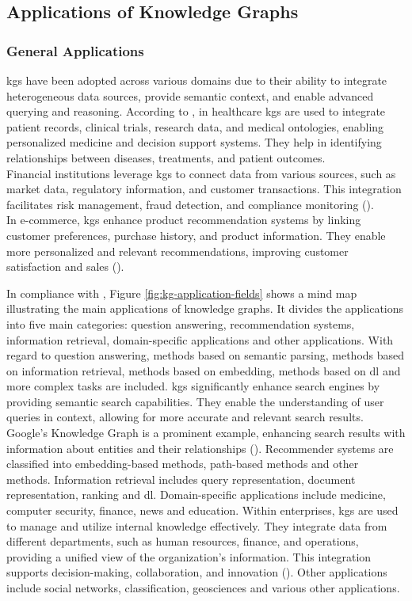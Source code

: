 \subsection*{Applications of Knowledge Graphs}

\subsubsection*{General Applications}
\glspl{kg} have been adopted across various domains due to their ability to integrate heterogeneous data sources, provide semantic context, and enable advanced querying and reasoning.
According to \cite{Kapanipathi2020}, in healthcare \glspl{kg} are used to integrate patient records, clinical trials, research data, and medical ontologies, enabling personalized medicine and decision support systems. They help in identifying relationships between diseases, treatments, and patient outcomes.
\\Financial institutions leverage \glspl{kg} to connect data from various sources, such as market data, regulatory information, and customer transactions. This integration facilitates risk management, fraud detection, and compliance monitoring (\cite{Tchechmedjiev2019}).
\\In e-commerce, \glspl{kg} enhance product recommendation systems by linking customer preferences, purchase history, and product information. They enable more personalized and relevant recommendations, improving customer satisfaction and sales (\cite{Zhang2021}).

In compliance with \cite{Zou2020}, Figure \ref{fig:kg-application-fields} shows a mind map illustrating the main applications of knowledge graphs. It divides the applications into five main categories: question answering, recommendation systems, information retrieval, domain-specific applications and other applications. With regard to question answering, methods based on semantic parsing, methods based on information retrieval, methods based on embedding, methods based on \gls{dl} and more complex tasks are included.
\glspl{kg} significantly enhance search engines by providing semantic search capabilities. They enable the understanding of user queries in context, allowing for more accurate and relevant search results. Google's Knowledge Graph is a prominent example, enhancing search results with information about entities and their relationships (\cite{singhal2012introducing}).
Recommender systems are classified into embedding-based methods, path-based methods and other methods. Information retrieval includes query representation, document representation, ranking and \gls{dl}. Domain-specific applications include medicine, computer security, finance, news and education.
Within enterprises, \glspl{kg} are used to manage and utilize internal knowledge effectively. They integrate data from different departments, such as human resources, finance, and operations, providing a unified view of the organization's information. This integration supports decision-making, collaboration, and innovation (\cite{pujara2013knowledge}).
Other applications include social networks, classification, geosciences and various other applications.


